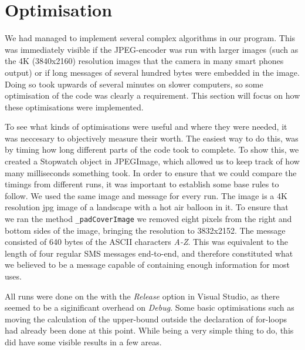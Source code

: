 \section{Optimisation}
We had managed to implement several complex algorithms in our program.
This was immediately visible if the JPEG-encoder was run with larger images (such as the 4K (3840x2160) resolution images that the camera in many smart phones output) or if long messages of several hundred bytes were embedded in the image.
Doing so took upwards of several minutes on slower computers, so some optimisation of the code was clearly a requirement.
This section will focus on how these optimisations were implemented.
\vspace*{12pt}

To see what kinds of optimisations were useful and where they were needed, it was neccesary to objectively measure their worth.
The easiest way to do this, was by timing how long different parts of the code took to complete.
To show this, we created a Stopwatch object in JPEGImage, which allowed us to keep track of how many milliseconds something took.
In order to ensure that we could compare the timings from different runs, it was important to establish some base rules to follow.
We used the same image and message for every run.
The image is a 4K resolution jpg image of a landscape with a hot air balloon in it.
To ensure that we ran the method \lstinline|_padCoverImage| we removed eight pixels from the right and bottom sides of the image, bringing the resolution to 3832x2152.
The message consisted of 640 bytes of the ASCII characters \textit{A-Z}.
This was equivalent to the length of four regular SMS messages end-to-end, and therefore constituted what we believed to be a message capable of containing enough information for most uses.

All runs were done on the with the \textit{Release} option in Visual Studio, as there seemed to be a siginificant overhead on \textit{Debug}.
Some basic optimisations such as moving the calculation of the upper-bound outside the declaration of for-loops had already been done at this point.
While being a very simple thing to do, this did have some visible results in a few areas.

